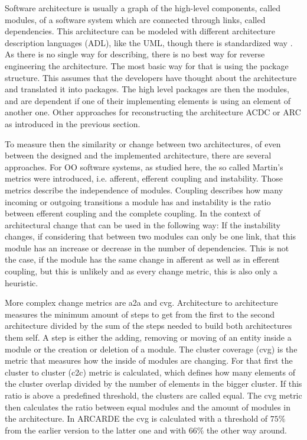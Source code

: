 \documentclass[conference]{IEEEtran}
\begin{document}
Software architecture is usually a graph of the high-level components, called modules, of a software system which are connected through links, called dependencies. This architecture can be modeled with different architecture description languages (ADL), like the UML, though there is standardized way \cite{UML-Arch}. 
As there is no single way for describing, there is no best way for reverse engineering the architecture. The most basic way for that is using the package structure. This assumes that the developers have thought about the architecture and translated it into packages. The high level packages are then the modules, and are dependent if one of their implementing elements is using an element of another one. 
Other approaches for reconstructing the architecture ACDC or ARC as introduced in the previous section.

To measure then the similarity or change between two architectures, of even between the designed and the implemented architecture, there are several approaches. For OO software systems, as studied here, the so called Martin's metrics \cite{martinsMetrics} were introduced, i.e. afferent, efferent coupling and instability. Those metrics describe the independence of modules. Coupling describes how many incoming or outgoing transitions a module has and instability is the ratio between efferent coupling and the complete coupling. 
In the context of architectural change that can be used in the following way: If the instability changes, if considering that between two modules can only be one link, that this module has an increase or decrease in the number of dependencies. This is not the case, if the module has the same change in afferent as well as in efferent coupling, but this is unlikely and as every change metric, this is also only a heuristic. 

More complex change metrics are a2a and cvg. Architecture to architecture measures the minimum amount of steps to get from the first to the second architecture divided by the sum of the steps needed to build both architectures them self. A step is either the adding, removing or moving of an entity inside a module or the creation or deletion of a module. 
The cluster coverage (cvg) is the metric that measures how the inside of modules are changing. For that first the cluster to cluster (c2c) metric is calculated, which defines how many elements of the cluster overlap divided by the number of elements in the bigger cluster. If this ratio is above a predefined threshold, the clusters are called equal. The cvg metric then calculates the ratio between equal modules and the amount of modules in the architecture. In ARCARDE the cvg is calculated with a threshold of $75\%$ from the earlier version to the latter one and with $66\%$ the other way around. 
\end{document}
